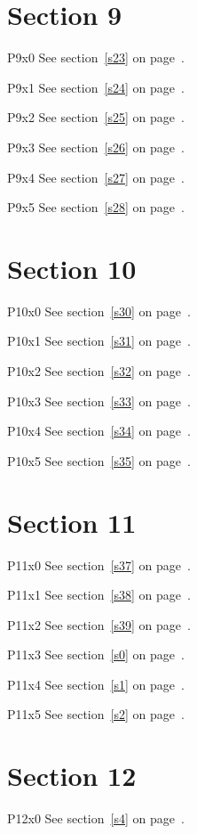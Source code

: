 \section{Section 9}\label{s9}
P9x0 \w\w\w\w\w\w See section~\ref{s23} on page~\pageref{s27}.

P9x1 \w\w\w\w\w\w See section~\ref{s24} on page~\pageref{s28}.

P9x2 \w\w\w\w\w\w See section~\ref{s25} on page~\pageref{s29}.

P9x3 \w\w\w\w\w\w See section~\ref{s26} on page~\pageref{s30}.

P9x4 \w\w\w\w\w\w See section~\ref{s27} on page~\pageref{s31}.

P9x5 \w\w\w\w\w\w See section~\ref{s28} on page~\pageref{s32}.

\section{Section 10}\label{s10}
P10x0 \w\w\w\w\w\w See section~\ref{s30} on page~\pageref{s30}.

P10x1 \w\w\w\w\w\w See section~\ref{s31} on page~\pageref{s31}.

P10x2 \w\w\w\w\w\w See section~\ref{s32} on page~\pageref{s32}.

P10x3 \w\w\w\w\w\w See section~\ref{s33} on page~\pageref{s33}.

P10x4 \w\w\w\w\w\w See section~\ref{s34} on page~\pageref{s34}.

P10x5 \w\w\w\w\w\w See section~\ref{s35} on page~\pageref{s35}.

\section{Section 11}\label{s11}
P11x0 \w\w\w\w\w\w See section~\ref{s37} on page~\pageref{s33}.

P11x1 \w\w\w\w\w\w See section~\ref{s38} on page~\pageref{s34}.

P11x2 \w\w\w\w\w\w See section~\ref{s39} on page~\pageref{s35}.

P11x3 \w\w\w\w\w\w See section~\ref{s0} on page~\pageref{s36}.

P11x4 \w\w\w\w\w\w See section~\ref{s1} on page~\pageref{s37}.

P11x5 \w\w\w\w\w\w See section~\ref{s2} on page~\pageref{s38}.

\section{Section 12}\label{s12}
P12x0 \w\w\w\w\w\w See section~\ref{s4} on page~\pageref{s36}.

